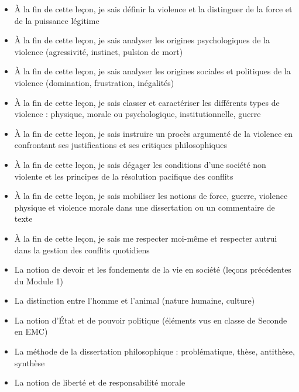 \documentclass[11pt]{article}
\begin{document}
\begin{objectifs}
\begin{itemize}
\item À la fin de cette leçon, je sais définir la violence et la distinguer de la force et de la puissance légitime
\item À la fin de cette leçon, je sais analyser les origines psychologiques de la violence (agressivité, instinct, pulsion de mort)
\item À la fin de cette leçon, je sais analyser les origines sociales et politiques de la violence (domination, frustration, inégalités)
\item À la fin de cette leçon, je sais classer et caractériser les différents types de violence : physique, morale ou psychologique, institutionnelle, guerre
\item À la fin de cette leçon, je sais instruire un procès argumenté de la violence en confrontant ses justifications et ses critiques philosophiques
\item À la fin de cette leçon, je sais dégager les conditions d'une société non violente et les principes de la résolution pacifique des conflits
\item À la fin de cette leçon, je sais mobiliser les notions de force, guerre, violence physique et violence morale dans une dissertation ou un commentaire de texte
\item À la fin de cette leçon, je sais me respecter moi-même et respecter autrui dans la gestion des conflits quotidiens
\end{itemize}
\end{objectifs}

\begin{prerequis}
\begin{itemize}
\item La notion de devoir et les fondements de la vie en société (leçons précédentes du Module 1)
\item La distinction entre l'homme et l'animal (nature humaine, culture)
\item La notion d'État et de pouvoir politique (éléments vus en classe de Seconde en EMC)
\item La méthode de la dissertation philosophique : problématique, thèse, antithèse, synthèse
\item La notion de liberté et de responsabilité morale
\end{itemize}
\end{prerequis}

\newpage
\end{document}
